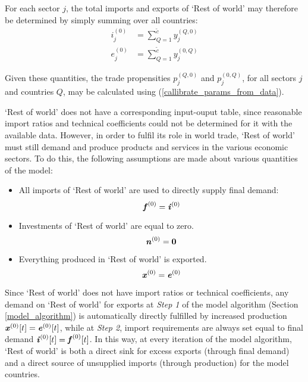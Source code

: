 \documentclass[preprint,authoryear,3p]{elsarticle}
\begin{document}
For each sector $j$, the total imports and exports of `Rest of world' may therefore be determined by simply summing over all countries:
\begin{align*}
i^{(0)}_j &= \sum_{Q=1}^{\tilde{c}} y^{ \left( Q,0 \right) }_{j} \\
e^{(0)}_j &= \sum_{Q=1}^{\tilde{c}} y^{ \left( 0,Q \right) }_{j}
\end{align*}

Given these quantities, the trade propensities $p^{ \left( Q,0 \right) }_j$ and $p^{ \left( 0,Q \right) }_j$, for all sectors $j$ and countries $Q$, may be calculated using (\ref{callibrate_params_from_data}).

`Rest of world' does not have a corresponding input-ouput table, since reasonable import ratios and technical coefficients could not be determined for it with the available data. However, in order to fulfil its role in world trade, `Rest of world' must still demand and produce products and services in the various economic sectors. To do this, the following assumptions are made about various quantities of the model:

\begin{itemize}
\item All imports of `Rest of world' are used to directly supply final demand:
$$
\textbf{\textit{f}}^{(0)} = \textbf{\textit{i}}^{(0)}
$$
\item Investments of `Rest of world' are equal to zero.
$$
\textbf{\textit{n}}^{(0)} = \textbf{0}
$$
\item Everything produced in `Rest of world' is exported.
$$
\textbf{\textit{x}}^{(0)} = \textbf{\textit{e}}^{(0)}
$$
\end{itemize}

Since `Rest of world' does not have import ratios or technical coefficients, any demand on `Rest of world' for exports at \textit{Step 1} of the model algorithm (Section \ref{model_algorithm}) is automatically directly fulfilled by increased production $\textbf{\textit{x}}^{(0)}[t] = \textbf{\textit{e}}^{(0)}[t]$, while at \textit{Step 2}, import requirements are always set equal to final demand $\textbf{\textit{i}}^{(0)}[t] = \textbf{\textit{f}}^{(0)}[t]$. In this way, at every iteration of the model algorithm, `Rest of world' is both a direct sink for excess exports (through final demand) and a direct source of unsupplied imports (through production) for the model countries.
\end{document}
